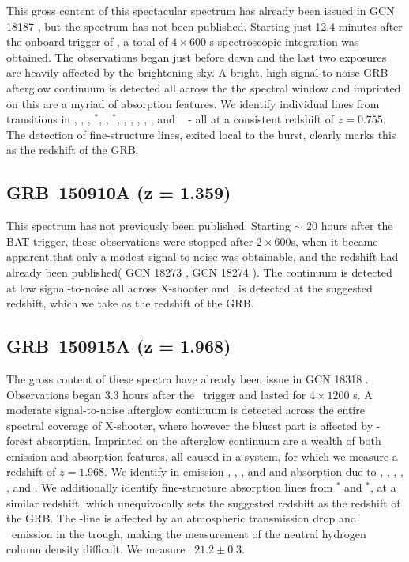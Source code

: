 \documentclass{aa}    %
\begin{document}
This gross content of this spectacular spectrum has already been issued in GCN
18187 \citep{GCN18187}, but the spectrum has not been published. Starting just
12.4 minutes after the onboard trigger of \swift, a total of $4 \times 600$ s
spectroscopic integration was obtained. The observations began just before dawn
and the last two exposures are heavily affected by the brightening sky. A
bright, high signal-to-noise GRB afterglow continuum is detected all across the
the spectral window and imprinted on this are a myriad of absorption features.
We identify individual lines from transitions in \aliii, \crii, \znii,
\NIii$^*$, \feii, \feii$^*$, \scii, \mnii, \mgii, \mgi, \TIii, and  \caii~ - all
at a consistent redshift of $z = 0.755$. The detection of fine-structure lines,
exited local to the burst, clearly marks this as the redshift of the GRB.

\subsection{GRB~150910A (z = 1.359)}\label{150910}

This spectrum has not previously been published. Starting $\sim$ 20 hours after
the BAT trigger, these observations were stopped after $2 \times 600$s, when it
became apparent that only a modest signal-to-noise was obtainable, and the
redshift had already been published( GCN 18273 \citep{GCN18273}, GCN 18274
\citep{GCN18274}).  The continuum is detected at low signal-to-noise all across
X-shooter and \mgii~is detected at the suggested redshift, which we take as the
redshift of the GRB.

\subsection{GRB~150915A (z = 1.968)}\label{150915}

The gross content of these spectra have already been issue in GCN 18318
\citep{GCN18318}. Observations began 3.3 hours after the \swift~trigger and
lasted for $4 \times 1200$ s. A moderate signal-to-noise afterglow continuum is
detected across the entire spectral coverage of X-shooter, where however the
bluest part is affected by \lya-forest absorption. Imprinted on the afterglow
continuum are a wealth of both emission and absorption features, all caused in a
system, for which we measure a redshift of $z = 1.968$. We identify in emission
\oii, \hb, \oiii, and \ha and absorption due to \lya, \civ, \alii, \SIii, \feii,
and \mgii. We additionally identify fine-structure absorption lines from
\SIii$^*$ and \feii$^*$, at a similar redshift, which unequivocally sets the
suggested redshift as the redshift of the GRB. The \lya-line is affected by an
atmospheric transmission drop and \lya~emission in the trough, making the
measurement of the neutral hydrogen column density difficult. We measure
\nh~$21.2 \pm 0.3$.
\end{document}
